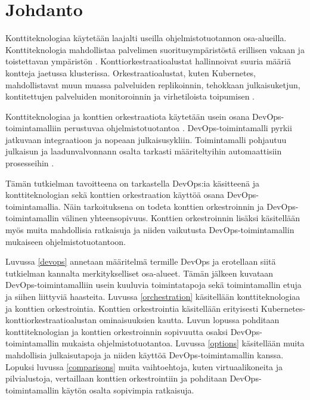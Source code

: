 \chapter{Johdanto\label{intro}}

Konttiteknologiaa käytetään laajalti useilla ohjelmistotuotannon osa-alueilla.
Konttiteknologia mahdollistaa palvelimen suoritusympäristöstä erillisen vakaan ja toistettavan ympäristön \cite{Watada19}.
Konttiorkestraatioalustat hallinnoivat suuria määriä kontteja jaetussa klusterissa.
Orkestraatioalustat, kuten Kubernetes, mahdollistavat muun muassa palveluiden replikoinnin, tehokkaan julkaisuketjun, kontitettujen palveluiden monitoroinnin ja virhetiloista toipumisen \cite{Khan17}.

Konttiteknologiaa ja konttien orkestraatiota käytetään usein osana DevOps-toimintamalliin perustuvaa ohjelmistotuotantoa \cite{Kang16, Narasimhulu23}.
DevOps-toimintamalli pyrkii jatkuvaan integraatioon ja nopeaan julkaisusykliin.
Toimintamalli pohjautuu julkaisun ja laadunvalvonnann osalta tarkasti määriteltyihin automaattisiin prosesseihin \cite{Jabbari16}.

Tämän tutkielman tavoitteena on tarkastella DevOps:ia käsitteenä ja konttiteknologian sekä konttien orkestraation käyttöä osana DevOps-toimintamallia.
Näin tarkoituksena on todeta konttien orkestroinnin ja DevOps-toimintamallin välinen yhteensopivuus.
Konttien orkestroinnin lisäksi käsitellään myös muita mahdollisia ratkaisuja ja niiden vaikutusta DevOps-toimintamallin mukaiseen ohjelmistotuotantoon.

Luvussa \ref{devops} annetaan määritelmä termille DevOps ja erotellaan siitä tutkielman kannalta merkitykselliset osa-alueet.
Tämän jälkeen kuvataan DevOps-toimintamalliin usein kuuluvia toimintatapoja sekä toimintamallin etuja ja siihen liittyviä haasteita.
Luvussa \ref{orchestration} käsitellään konttiteknologiaa ja konttien orkestrointia.
Konttien orkestrointia käsitellään erityisesti Kubernetes-konttiorkestraatioalustan ominaisuuksien kautta.
Luvun lopussa pohditaan konttiteknologian ja konttien orkestroinnin sopivuutta osaksi DevOps-toimintamallin mukaista ohjelmistotuotantoa.
Luvussa \ref{options} käsitellään muita mahdollisia julkaisutapoja ja niiden käyttöä DevOps-toimintamallin kanssa.
Lopuksi luvussa \ref{comparisons} muita vaihtoehtoja, kuten virtuaalikoneita ja pilvialustoja, vertaillaan konttien orkestrointiin ja pohditaan DevOps-toimintamallin käytön osalta sopivimpia ratkaisuja.
